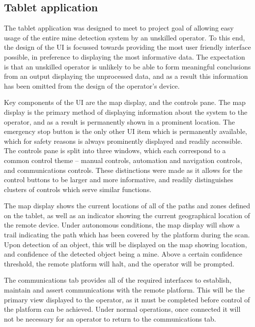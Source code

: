 \documentclass[main.tex]{subfiles}
\begin{document}
\subsection{Tablet application}
The tablet application was designed to meet to project goal of allowing easy usage of the entire mine detection system by an unskilled operator. To this end, the design of the UI is focussed towards providing the most user friendly interface possible, in preference to displaying the most informative data. The expectation is that an unskilled operator is unlikely to be able to form meaningful conclusions from an output displaying the unprocessed data, and as a result this information has been omitted from the design of the operator’s device. 

Key components of the UI are the map display, and the controls pane. The map display is the primary method of displaying information about the system to the operator, and as a result is permanently shown in a prominent location. The emergency stop button is the only other UI item which is permanently available, which for safety reasons is always prominently displayed and readily accessible. The controls pane is split into three windows, which each correspond to a common control theme – manual controls, automation and navigation controls, and communications controls. These distinctions were made as it allows for the control buttons to be larger and more informative, and readily distinguishes clusters of controls which serve similar functions. 

The map display shows the current locations of all of the paths and zones defined on the tablet, as well as an indicator showing the current geographical location of the remote device. Under autonomous conditions, the map display will show a trail indicating the path which has been covered by the platform during the scan. Upon detection of an object, this will be displayed on the map showing location, and confidence of the detected object being a mine. Above a certain confidence threshold, the remote platform will halt, and the operator will be prompted.

The communications tab provides all of the required interfaces to establish, maintain and assert communications with the remote platform. This will be the primary view displayed to the operator, as it must be completed before control of the platform can be achieved. Under normal operations, once connected it will not be necessary for an operator to return to the communications tab.
\end{document}

